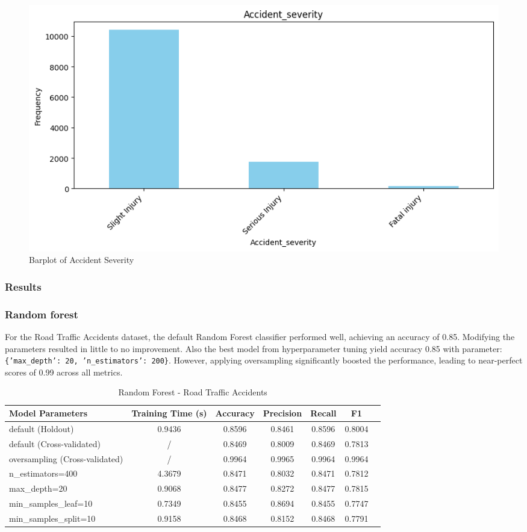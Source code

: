 \documentclass{article}
\begin{document}
\begin{figure}[H]
\centering
\includegraphics[width=1\linewidth]{Accident_severity.png}
\caption{\label{fig:bar:severity} Barplot of Accident Severity}
\end{figure}



\subsubsection{Results}
\subsubsection*{Random forest}
For the Road Traffic Accidents dataset, the default Random Forest classifier performed well, achieving an accuracy of 0.85. Modifying the parameters resulted in little to no improvement. Also the best model from hyperparameter tuning yield accuracy 0.85 with parameter: \texttt{\{'max\_depth': 20, 'n\_estimators': 200\}}. However, applying oversampling significantly boosted the performance, leading to near-perfect scores of 0.99 across all metrics.


\begin{table}[H]
\centering
\begin{tabular}{l|c|c|c|c|c|c}
\textbf{Model Parameters} & \textbf{Training Time (s)} & \textbf{Accuracy} & \textbf{Precision} & \textbf{Recall} & \textbf{F1} \\\hline
default (Holdout) & 0.9436  & 0.8596 & 0.8461 & 0.8596 & 0.8004 \\
default (Cross-validated) & /  & 0.8469 & 0.8009 & 0.8469 & 0.7813 \\
oversampling (Cross-validated) & /  & 0.9964 & 0.9965 & 0.9964 & 0.9964 \\
n\_estimators=400 & 4.3679  & 0.8471 & 0.8032 & 0.8471  & 0.7812 \\
max\_depth=20 & 0.9068  & 0.8477 & 0.8272 & 0.8477 & 0.7815 \\
min\_samples\_leaf=10 & 0.7349  & 0.8455  & 0.8694 & 0.8455 & 0.7747 \\
min\_samples\_split=10 & 0.9158  & 0.8468 & 0.8152 & 0.8468 & 0.7791 \\
\end{tabular}
\caption{Random Forest - Road Traffic Accidents}
\label{tab:Random Forest - Road Traffic Accidents}
\end{table}
\end{document}
